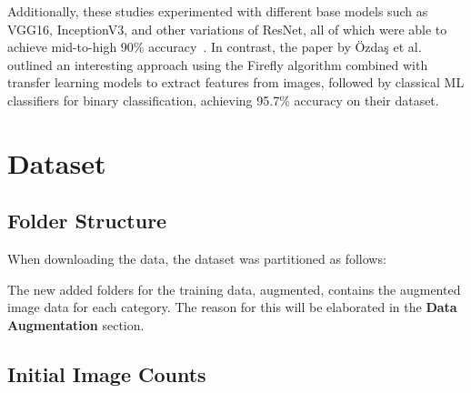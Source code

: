 \documentclass[11pt]{article}
\begin{document}
Additionally, these studies experimented with different base models such as VGG16, InceptionV3, and other variations of ResNet, all of which were able to achieve mid-to-high 90\% accuracy~\citep{9002415,Kermany2018-dc,Miladinovic2024-og}. In contrast, the paper by Özdaş et al.~\citeyearpar{diagnostics13030433} outlined an interesting approach using the Firefly algorithm combined with transfer learning models to extract features from images, followed by classical ML classifiers for binary classification, achieving 95.7\% accuracy on their dataset.

\section{Dataset}

\subsection{Folder Structure}

When downloading the data, the dataset was partitioned as follows:


\vspace*{0.1cm}

The new added folders for the training data, augmented, contains the augmented image data for each category. The reason for this will be elaborated in the \textbf{Data Augmentation} section.

\vfill

\subsection{Initial Image Counts}
\end{document}
